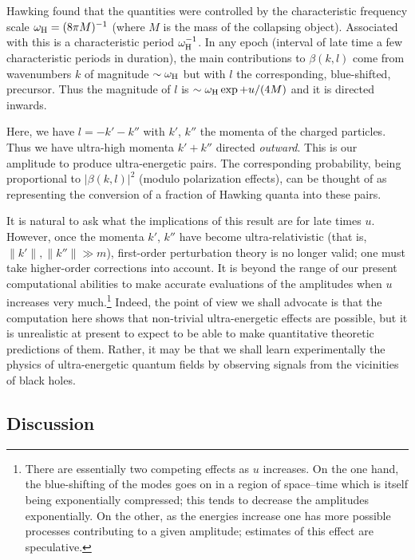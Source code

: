 \documentclass[12pt]{article}
\begin{document}
Hawking found that the quantities were controlled by the characteristic 
frequency scale $\omega _{\rm H}=(8\pi M)^{-1}$ (where $M$ is the mass of the
collapsing object).  Associated with this is a characteristic period $\omega
_{\rm H}^{-1}$.  In any epoch (interval of late time a few characteristic
periods in duration), the main contributions to $\beta (k,l)$ come from
wavenumbers $k$ of magnitude $\sim \omega _{\rm H}$ but with $l$ the
corresponding, blue-shifted, precursor.  Thus the magnitude of $l$ is $\sim
\omega _{\rm H}\exp +u/(4M)$ and it is directed inwards.

Here, we have $l=-k'-k''$ with $k'$, $k''$ the momenta of the charged
particles. Thus we have ultra-high momenta $k'+k''$ directed {\em outward}. 
This is our amplitude to produce ultra-energetic pairs. The corresponding
probability, being proportional to $|\beta (k,l)|^2$ (modulo polarization
effects), can be thought of as representing the conversion of a fraction of
Hawking quanta into these pairs.

It is natural to ask what the implications of this result are for late
times $u$. 
However, once the momenta $k'$, $k''$ have become ultra-relativistic
(that
is, $\| k'\| ,\| k''\|\gg m$), first-order perturbation theory is no longer
valid; one must take higher-order corrections into account.  It is beyond the
range of our present computational abilities to make accurate evaluations of the
amplitudes when $u$ increases very much.\footnote{There are essentially two
competing effects as $u$ increases.  On the one hand, the blue-shifting of the
modes 
goes on in a region of
space--time which is itself being exponentially compressed; this tends to
decrease the amplitudes exponentially.  On the other, as the energies increase
one has more possible processes contributing to a given amplitude; estimates
of this effect are speculative.}
Indeed, the point of view we shall
advocate is that the computation here shows that non-trivial
ultra-energetic effects are possible, but it is unrealistic at present to expect
to be able to make quantitative theoretic predictions of them.  Rather, it may
be that we shall learn experimentally the physics of ultra-energetic quantum
fields by observing signals from the vicinities of black holes.


\subsection{Discussion}
\label{dis}
\end{document}
